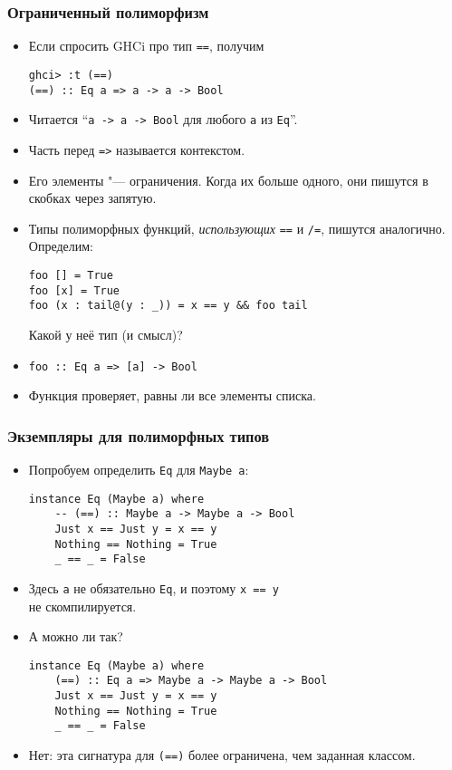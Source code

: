 \documentclass[10pt]{beamer}
\begin{document}
\begin{frame}[fragile]
\frametitle{Ограниченный полиморфизм}
\begin{itemize}
    \item Если спросить GHCi про тип \lstinline|==|, получим
\begin{lstlisting}[basicstyle=\ttfamily\small]
ghci> :t (==)
(==) :: Eq a => a -> a -> Bool
\end{lstlisting}
    \item Читается \enquote{\lstinline|a -> a -> Bool| для любого \lstinline|a| из \lstinline|Eq|}.
    \item Часть перед \lstinline|=>| называется контекстом. 
    \item Его элементы "--- ограничения. Когда их больше одного, они пишутся в скобках через запятую.\pause
    \item Типы полиморфных функций, \emph{использующих} \lstinline|==| и \lstinline|/=|, пишутся аналогично. Определим:
\begin{lstlisting}[basicstyle=\ttfamily\small]
foo [] = True
foo [x] = True
foo (x : tail@(y : _)) = x == y && foo tail
\end{lstlisting}
    Какой у неё тип (и смысл)? \pause
    \item \lstinline[basicstyle=\ttfamily\small]|foo :: Eq a => [a] -> Bool| \pause
    \item Функция проверяет, равны ли все элементы списка.
\end{itemize}
\end{frame}

\begin{frame}[fragile]
\frametitle{Экземпляры для полиморфных типов}
\begin{itemize}
    \item Попробуем определить \lstinline|Eq| для \lstinline|Maybe a|:\pause
\begin{lstlisting}[basicstyle=\ttfamily\small]
instance Eq (Maybe a) where
    -- (==) :: Maybe a -> Maybe a -> Bool
    Just x == Just y = x == y
    Nothing == Nothing = True
    _ == _ = False
\end{lstlisting}
     \pause
    \item Здесь \lstinline|a| не обязательно \lstinline|Eq|, и поэтому \lstinline|x == y| \\не скомпилируется.
    \item А можно ли так?
\begin{lstlisting}[basicstyle=\ttfamily\small]
instance Eq (Maybe a) where
    (==) :: Eq a => Maybe a -> Maybe a -> Bool
    Just x == Just y = x == y
    Nothing == Nothing = True
    _ == _ = False
\end{lstlisting} \pause
    \item Нет: эта сигнатура для \lstinline|(==)| более ограничена, чем заданная классом.
\end{itemize}
\end{frame}
\end{document}

